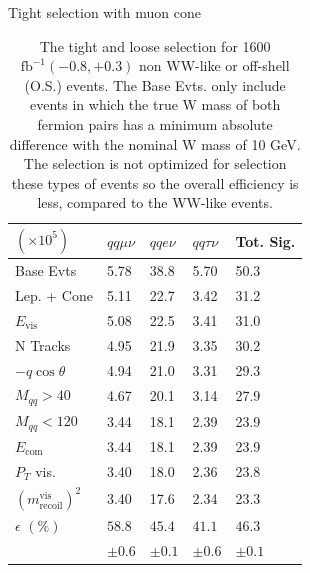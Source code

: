 \begin{table}
\centering
\caption{The tight and loose selection for 1600 $\text{fb}^{-1} (-0.8,+0.3)$ non WW-like or off-shell (O.S.) events.  The Base
Evts. only include events in which the true W mass of both fermion pairs has a minimum absolute difference
with the nominal W mass of 10 GeV. The selection is not optimized for selection these types of events so the overall efficiency is less, compared to the WW-like events.}
\begin{minipage}{0.49\linewidth}
\scriptsize
 Tight selection with muon cone \\
\begin{tabular}{|p{}|p{}p{}p{}|p{}|}
\hline
  $(\times 10^5)$& $qq\mu\nu$ & $qqe\nu$ & $qq\tau\nu$ & Tot. Sig. \\ 
\hline
Base Evts &{5.78 } & {38.8 } & {5.70} & 50.3\\ 
 
Lep. + Cone &{5.11 } & {22.7 } & {3.42} & 31.2\\ 

$E_{\text{vis}}$ &{5.08 } & {22.5 } & {3.41} & 31.0\\ 

N Tracks &{4.95 } & {21.9 } & {3.35}& 30.2\\ 
 
$-q\cos\theta$ &{4.94 } & {21.0 } & {3.31}& 29.3\\ 
 
$M_{qq}>40$ &{4.67} & {20.1 } & {3.14} & 27.9\\ 
 
$M_{qq}<120$ &{3.44 } & {18.1 } & {2.39} & 23.9\\ 

$E_{\text{com}}$ &{3.44 } & {18.1 } & {2.39} & 23.9\\ 
 
$P_T$ vis. &{3.40 } & {18.0 } & {2.36} & 23.8\\ 
 
$(m^{\text{vis}}_{\text{recoil}})^2$ & {3.40 } & {17.6 } & {2.34}& 23.3\\ 
\hline 
 $\epsilon \, \, (\%)$ & $58.8$ & $45.4$ & $41.1$ & $46.3$ \\ 
 						& $\pm 0.6$ & $\pm 0.1$ & $\pm 0.6$ & $\pm 0.1$\\
 \hline
\end{tabular}
\end{minipage}



\end{table}
